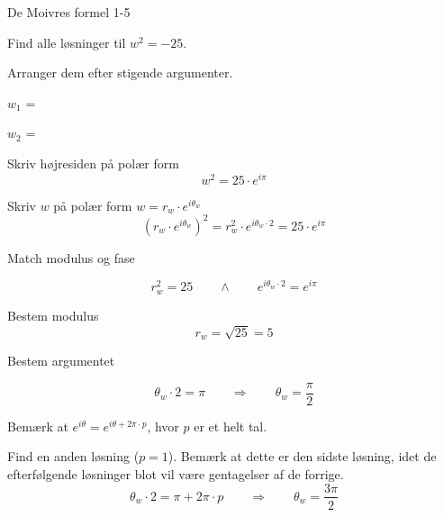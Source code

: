 \documentclass{article}
\begin{document}
\newpage

\begin{exercise}{De Moivres formel 1-5}

Find alle løsninger til $w^2=-25$. 

Arranger dem efter stigende argumenter.

$w_1$ = 		

$w_2$ = 		


\hint 

Skriv højresiden på polær form
\[
w^2 = 25 \cdot e^{i \pi}
\]


\hint

Skriv $w$ på polær form $w = r_w \cdot e^{i \theta_w}$
\[
\left(r_w \cdot e^{i \theta_w}\right)^2 = r_w^2 \cdot e^{i \theta_w \cdot 2} = 25 \cdot e^{i \pi}
\]

\hint 
Match modulus og fase

\[
r_w^2 = 25 \qquad \wedge \qquad e^{i \theta_w \cdot 2} = e^{i \pi}
\]

\hint

Bestem modulus
\[
r_w  =  \sqrt{25} = 5
\]

\hint

Bestem argumentet

\[
\theta_w \cdot 2 = \pi \qquad \Rightarrow \qquad  \theta_w = \frac{\pi}{2}
\]

\hint

Bemærk at $e^{i \theta} = e^{i \theta + 2 \pi \cdot p}$, hvor $p$ er et helt tal.

\hint

Find en anden løsning ($p=1$). 
Bemærk at dette er den sidste løsning, idet de efterfølgende 
løsninger blot vil være gentagelser af de forrige.
\[
\theta_w \cdot 2 = \pi  + 2 \pi \cdot p \qquad \Rightarrow \qquad  \theta_w = \frac{3 \pi}{2}
\]



\end{exercise}

\newpage
\end{document}

